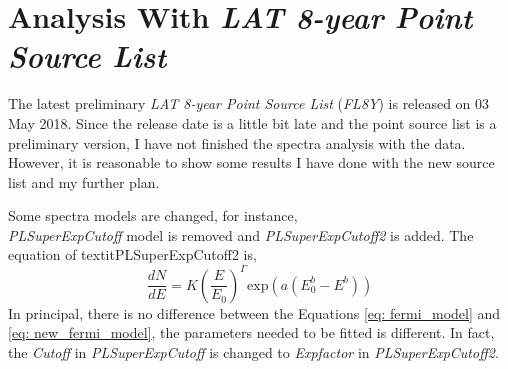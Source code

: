 \documentclass[12pt]{report}
\begin{document}
    \section{Analysis With \textit{LAT 8-year Point Source List}}
      The latest preliminary \textit{LAT 8-year Point Source List} (\textit{FL8Y}) is released 
      on 03 May 2018. Since the release date is a little bit late and the point source list is a 
      preliminary version, I have not finished the spectra analysis with the data. However, it is 
      reasonable to show some results I have done with the new source list and my further plan.

      Some spectra models are changed, for instance, 
      \\ \textit{PLSuperExpCutoff} model is removed and 
      \textit{PLSuperExpCutoff\mbox{2}} is added. The equation of textit{PLSuperExpCutoff\mbox{2}}
      \cite{newFermiModel} is,
      \begin{equation}
        \frac{dN}{dE} = K\left(\frac{E}{E_0}\right)^{\Gamma} \mbox{exp}\left(a\left(E_0^b-E^b\right)\right) 
        \label{eq: new_fermi_model}
      \end{equation}
      In principal, there is no difference between the Equations \ref{eq: fermi_model} and 
      \ref{eq: new_fermi_model}, the parameters needed to be fitted is different. In fact, the 
      \textit{Cutoff} in \textit{PLSuperExpCutoff} is changed to \textit{Expfactor} in 
      \textit{PLSuperExpCutoff\mbox{2}}. 
      
\end{document}
